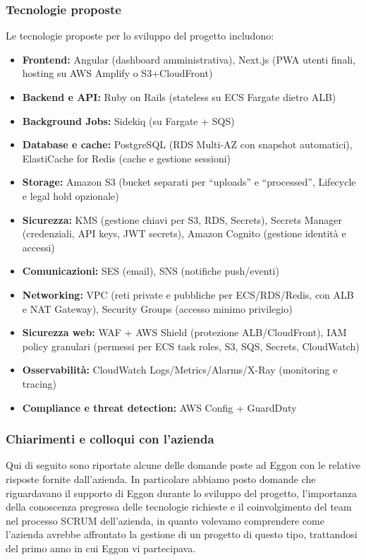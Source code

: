 \documentclass[a4paper,11pt]{article}
\begin{document}
\subsubsection{Tecnologie proposte}
Le tecnologie proposte per lo sviluppo del progetto includono:
\begin{itemize}[noitemsep, topsep=0pt]
  \item \textbf{Frontend:} Angular (dashboard amministrativa), Next.js (PWA utenti finali, hosting su AWS Amplify o S3+CloudFront)
  \item \textbf{Backend e API:} Ruby on Rails (stateless su ECS Fargate dietro ALB)
  \item \textbf{Background Jobs:} Sidekiq (su Fargate + SQS)
  \item \textbf{Database e cache:} PostgreSQL (RDS Multi-AZ con snapshot automatici), ElastiCache for Redis (cache e gestione sessioni)
  \item \textbf{Storage:} Amazon S3 (bucket separati per “uploads” e “processed”, Lifecycle e legal hold opzionale)
  \item \textbf{Sicurezza:} KMS (gestione chiavi per S3, RDS, Secrets), Secrets Manager (credenziali, API keys, JWT secrets), Amazon Cognito (gestione identità e accessi)
  \item \textbf{Comunicazioni:} SES (email), SNS (notifiche push/eventi)
  \item \textbf{Networking:} VPC (reti private e pubbliche per ECS/RDS/Redis, con ALB e NAT Gateway), Security Groups (accesso minimo privilegio)
  \item \textbf{Sicurezza web:} WAF + AWS Shield (protezione ALB/CloudFront), IAM policy granulari (permessi per ECS task roles, S3, SQS, Secrets, CloudWatch)
  \item \textbf{Osservabilità:} CloudWatch Logs/Metrics/Alarms/X-Ray (monitoring e tracing)
  \item \textbf{Compliance e threat detection:} AWS Config + GuardDuty
\end{itemize}

\subsubsection{Chiarimenti e colloqui con l'azienda}

\parbox[t]{\linewidth}{%
Qui di seguito sono riportate alcune delle domande poste ad Eggon con le relative risposte fornite dall'azienda. In particolare abbiamo posto domande che riguardavano il supporto di Eggon durante lo sviluppo del progetto, l'importanza della conoscenza pregressa delle tecnologie richieste e il coinvolgimento del team nel processo SCRUM dell'azienda, in quanto volevamo comprendere come l'azienda avrebbe affrontato la gestione di un progetto di questo tipo, trattandosi del primo anno in cui Eggon vi partecipava.
}
\end{document}
